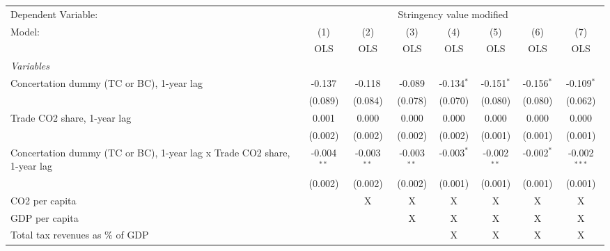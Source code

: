 
\begingroup
\centering
\begin{tabular}{lccccccc}
   \toprule
   Dependent Variable: & \multicolumn{7}{c}{Stringency value modified}\\
   Model:                                                                  & (1)           & (2)           & (3)           & (4)          & (5)           & (6)          & (7)\\  
                                                                           &  OLS          & OLS           & OLS           & OLS          & OLS           & OLS          & OLS\\  
   \midrule
   \emph{Variables}\\
   Concertation dummy (TC or BC), 1-year lag                               & -0.137        & -0.118        & -0.089        & -0.134$^{*}$ & -0.151$^{*}$  & -0.156$^{*}$ & -0.109$^{*}$\\   
                                                                           & (0.089)       & (0.084)       & (0.078)       & (0.070)      & (0.080)       & (0.080)      & (0.062)\\   
   Trade CO2 share, 1-year lag                                             & 0.001         & 0.000         & 0.000         & 0.000        & 0.000         & 0.000        & 0.000\\   
                                                                           & (0.002)       & (0.002)       & (0.002)       & (0.002)      & (0.001)       & (0.001)      & (0.001)\\   
   Concertation dummy (TC or BC), 1-year lag x Trade CO2 share, 1-year lag & -0.004$^{**}$ & -0.003$^{**}$ & -0.003$^{**}$ & -0.003$^{*}$ & -0.002$^{**}$ & -0.002$^{*}$ & -0.002$^{***}$\\   
                                                                           & (0.002)       & (0.002)       & (0.002)       & (0.001)      & (0.001)       & (0.001)      & (0.001)\\   
   CO2 per capita                                                          &               & X             & X             & X            & X             & X            & X\\  
   GDP per capita                                                          &               &               & X             & X            & X             & X            & X\\  
   Total tax revenues as \% of GDP                                         &               &               &               & X            & X             & X            & X\\  

\end{tabular}

